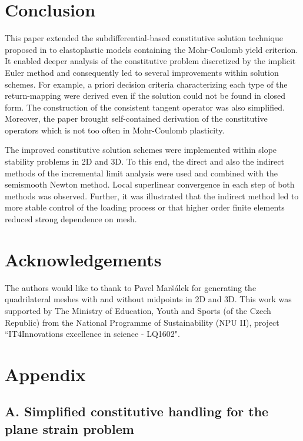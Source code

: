 \documentclass[a4paper,12pt]{article}
\theoremstyle{remark}
\numberwithin{equation}{section}
\begin{document}
\section{Conclusion}
\label{sec_conclusion}

This paper extended the subdifferential-based constitutive solution technique proposed in \cite{SCKKZB15} to elastoplastic models containing the Mohr-Coulomb yield criterion. It enabled deeper analysis of the constitutive problem discretized by the implicit Euler method and consequently led to several improvements within solution schemes. For example, a priori decision criteria characterizing each type of the return-mapping were derived even if the solution could not be found in closed form. The construction of the consistent tangent operator was also simplified. Moreover, the paper brought self-contained derivation of the constitutive operators which is not too often in Mohr-Coulomb plasticity.

The improved constitutive solution schemes were implemented within slope stability problems in 2D and 3D. To this end, the direct and also the indirect methods of the incremental limit analysis were used and combined with the semismooth Newton method. Local superlinear convergence in each step of both methods was observed. Further, it was illustrated that the indirect method led to more stable control of the loading process or that higher order finite elements reduced strong dependence on mesh. 

\section*{Acknowledgements}
The authors would like to thank to Pavel Mar\v s\'alek for generating the quadrilateral meshes with and without midpoints in 2D and 3D.
This work was supported by The Ministry of Education, Youth and Sports (of the Czech Republic)
from the National Programme of Sustainability (NPU II), project
``IT4Innovations excellence in science - LQ1602". 




\section*{Appendix}
\label{sec_appendix}

\subsection*{A. Simplified constitutive handling for the plane strain problem}
\end{document}
